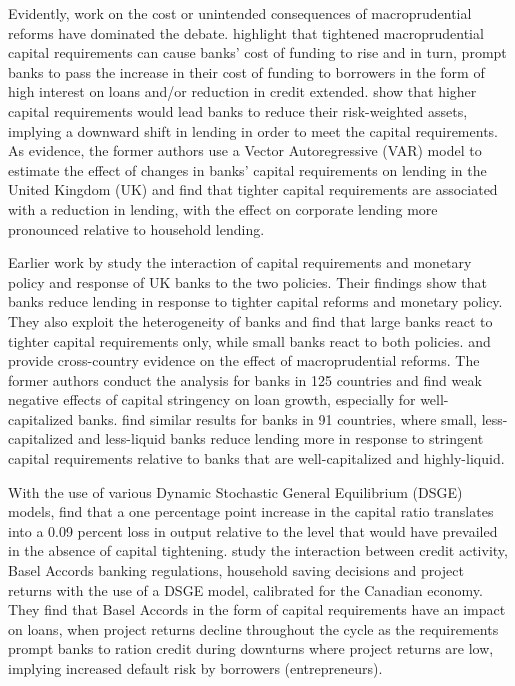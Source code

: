 \documentclass[
  letterpaper,
  DIV=11,
  numbers=noendperiod]{scrartcl}
\begin{document}
Evidently, work on the cost or unintended consequences of
macroprudential reforms have dominated the debate.
\cite{noss2016estimating} highlight that tightened macroprudential
capital requirements can cause banks' cost of funding to rise and in
turn, prompt banks to pass the increase in their cost of funding to
borrowers in the form of high interest on loans and/or reduction in
credit extended. \cite{deli2017real} show that higher capital
requirements would lead banks to reduce their risk-weighted assets,
implying a downward shift in lending in order to meet the capital
requirements. As evidence, the former authors use a Vector
Autoregressive (VAR) model to estimate the effect of changes in banks'
capital requirements on lending in the United Kingdom (UK) and find that
tighter capital requirements are associated with a reduction in lending,
with the effect on corporate lending more pronounced relative to
household lending.

Earlier work by \cite{aiyar2016does} study the interaction of capital
requirements and monetary policy and response of UK banks to the two
policies. Their findings show that banks reduce lending in response to
tighter capital reforms and monetary policy. They also exploit the
heterogeneity of banks and find that large banks react to tighter
capital requirements only, while small banks react to both policies.
\cite{deli2017real} and \cite{mirzaei2022effectiveness} provide
cross-country evidence on the effect of macroprudential reforms. The
former authors conduct the analysis for banks in 125 countries and find
weak negative effects of capital stringency on loan growth, especially
for well-capitalized banks. \cite{mirzaei2022effectiveness} find similar
results for banks in 91 countries, where small, less-capitalized and
less-liquid banks reduce lending more in response to stringent capital
requirements relative to banks that are well-capitalized and
highly-liquid.

With the use of various Dynamic Stochastic General Equilibrium (DSGE)
models, \cite{angelini2015b} find that a one percentage point increase
in the capital ratio translates into a 0.09 percent loss in output
relative to the level that would have prevailed in the absence of
capital tightening. \cite{berka2018basel} study the interaction between
credit activity, Basel Accords banking regulations, household saving
decisions and project returns with the use of a DSGE model, calibrated
for the Canadian economy. They find that Basel Accords in the form of
capital requirements have an impact on loans, when project returns
decline throughout the cycle as the requirements prompt banks to ration
credit during downturns where project returns are low, implying
increased default risk by borrowers (entrepreneurs).
\end{document}
